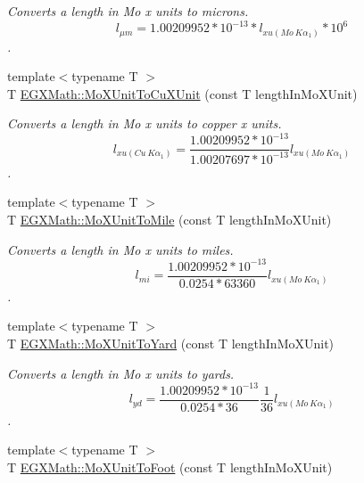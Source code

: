 \begin{DoxyCompactItemize}
\begin{DoxyCompactList}\small\item\em Converts a length in Mo x units to microns. \[ l_{\mu m}=1.00209952*10^{-13} * l_{xu(Mo\ K\alpha_1)} * 10^{6} \]. \end{DoxyCompactList}\item 
{\footnotesize template$<$typename T $>$ }\\T \mbox{\hyperlink{group___e_g_x_math-_conversions-_length_conversions-_non-_s_i-_mo_x_unit-_non-_s_i_ga15685a2e91cbe4f0ae403ed1b4c9b9b4}{E\+G\+X\+Math\+::\+Mo\+X\+Unit\+To\+Cu\+X\+Unit}} (const T length\+In\+Mo\+X\+Unit)
\begin{DoxyCompactList}\small\item\em Converts a length in Mo x units to copper x units. \[ l_{xu(Cu\ K\alpha_1)}= \frac{1.00209952*10^{-13}}{1.00207697*10^{-13}} l_{xu(Mo\ K\alpha_1)}\]. \end{DoxyCompactList}\item 
{\footnotesize template$<$typename T $>$ }\\T \mbox{\hyperlink{group___e_g_x_math-_conversions-_length_conversions-_non-_s_i-_mo_x_unit-_imperial_gabfdb228f43e8988c62daac3d6e71d7fa}{E\+G\+X\+Math\+::\+Mo\+X\+Unit\+To\+Mile}} (const T length\+In\+Mo\+X\+Unit)
\begin{DoxyCompactList}\small\item\em Converts a length in Mo x units to miles. \[ l_{mi}=\frac{1.00209952*10^{-13}}{0.0254 * 63360} l_{xu(Mo\ K\alpha_1)} \]. \end{DoxyCompactList}\item 
{\footnotesize template$<$typename T $>$ }\\T \mbox{\hyperlink{group___e_g_x_math-_conversions-_length_conversions-_non-_s_i-_mo_x_unit-_imperial_ga1b769f8b903e65e8d7027a9c427762ab}{E\+G\+X\+Math\+::\+Mo\+X\+Unit\+To\+Yard}} (const T length\+In\+Mo\+X\+Unit)
\begin{DoxyCompactList}\small\item\em Converts a length in Mo x units to yards. \[ l_{yd}= \frac{1.00209952*10^{-13}}{0.0254 * 36} \frac{1}{36} l_{xu(Mo\ K\alpha_1)} \]. \end{DoxyCompactList}\item 
{\footnotesize template$<$typename T $>$ }\\T \mbox{\hyperlink{group___e_g_x_math-_conversions-_length_conversions-_non-_s_i-_mo_x_unit-_imperial_ga4ea603df9560a6bba1fc18f36becdf00}{E\+G\+X\+Math\+::\+Mo\+X\+Unit\+To\+Foot}} (const T length\+In\+Mo\+X\+Unit)

\end{DoxyCompactItemize}
